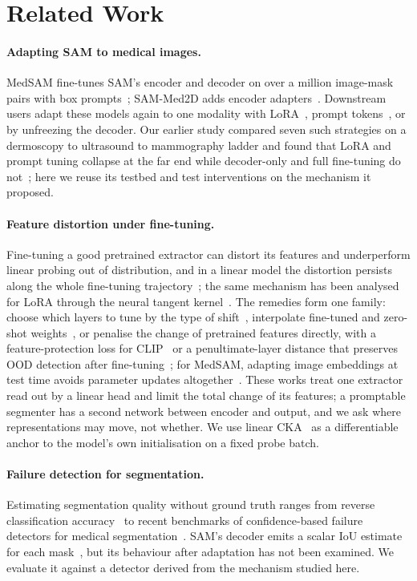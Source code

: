 \section{Related Work}
\label{sec:related}

\paragraph{Adapting SAM to medical images.}
MedSAM fine-tunes SAM's encoder and decoder on over a million image-mask pairs with box prompts~\cite{ma2024medsam}; SAM-Med2D adds encoder adapters~\cite{cheng2023sammed2d}. Downstream users adapt these models again to one modality with LoRA~\cite{hu2022lora}, prompt tokens~\cite{jia2022vpt}, or by unfreezing the decoder. Our earlier study compared seven such strategies on a dermoscopy to ultrasound to mammography ladder and found that LoRA and prompt tuning collapse at the far end while decoder-only and full fine-tuning do not~\cite{prior2026safer}; here we reuse its testbed and test interventions on the mechanism it proposed.

\paragraph{Feature distortion under fine-tuning.}
Fine-tuning a good pretrained extractor can distort its features and underperform linear probing out of distribution, and in a linear model the distortion persists along the whole fine-tuning trajectory~\cite{kumar2022finetuning}; the same mechanism has been analysed for LoRA through the neural tangent kernel~\cite{tomihari2024ntk}. The remedies form one family: choose which layers to tune by the type of shift~\cite{lee2023surgical}, interpolate fine-tuned and zero-shot weights~\cite{wortsman2022wiseft}, or penalise the change of pretrained features directly, with a feature-protection loss for CLIP~\cite{tan2024protection} or a penultimate-layer distance that preserves OOD detection after fine-tuning~\cite{zhang2025oodreg}; for MedSAM, adapting image embeddings at test time avoids parameter updates altogether~\cite{chen2025tta}. These works treat one extractor read out by a linear head and limit the total change of its features; a promptable segmenter has a second network between encoder and output, and we ask where representations may move, not whether. We use linear CKA~\cite{kornblith2019cka} as a differentiable anchor to the model's own initialisation on a fixed probe batch.

\paragraph{Failure detection for segmentation.}
Estimating segmentation quality without ground truth ranges from reverse classification accuracy~\cite{valindria2017rca} to recent benchmarks of confidence-based failure detectors for medical segmentation~\cite{zenk2024failure}. SAM's decoder emits a scalar IoU estimate for each mask~\cite{kirillov2023sam}, but its behaviour after adaptation has not been examined. We evaluate it against a detector derived from the mechanism studied here.
